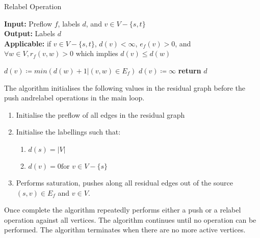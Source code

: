 \begin{algorithm}
	\caption{Relabel Operation}\label{alg:relabel}
	\textbf{Input:} Preflow $f$, labels $d$, and $v \in V-\{s,t\}$\\
	\textbf{Output:} Labels $d$\\
	\textbf{Applicable:} if $v \in V-\{s,t\}$, $d(v) < \infty$, $e_f(v)>0$, and $\forall w \in V, r_f(v,w)>0$ which implies $d(v) \leq d(w)$
	\begin{algorithmic}[1]
		\State $d(v) \coloneqq min(d(w)+1 | (v,w) \in E_f)$
		\Else 
		\State $d(v) \coloneqq \infty$
		\EndIf
		\State \textbf{return} $d$
		\EndProcedure
	\end{algorithmic}
\end{algorithm}

The algorithm initialises the following values in the residual graph before the push andrelabel operations in the main loop.
\begin{enumerate}
	\item Initialise the preflow of all edges in the  residual graph
	
	\item Initialise the labellings such that:
	\begin{enumerate}
		\item $d(s) = |V|$
		\item $d(v) = 0 \text{for } v \in V-\{s\}$
	\end{enumerate}
	
	\item Performs saturation, pushes along all residual edges out of the source $(s,v) \in E_f$ and $v \in V$.
\end{enumerate}
Once complete the algorithm repeatedly performs either a push or a relabel operation against all vertices. The algorithm continues until no operation can be performed. The algorithm terminates when there are no more active vertices.

